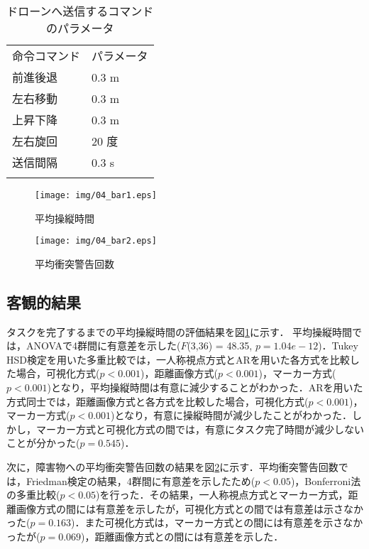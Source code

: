 \documentclass[submit]{ipsj}
\begin{document}
\begin{table}[tb]
  \caption{ドローンへ送信するコマンドのパラメータ}
  \label{tab:command_parameter}
  \centering
  \begin{tabular}{ll}
    \hline\noalign{\smallskip}
    命令コマンド &  パラメータ       \\
    \noalign{\smallskip}\hline\noalign{\smallskip}
    前進後退     & 0.3 m       \\
    左右移動     & 0.3 m       \\
    上昇下降     & 0.3 m       \\
    左右旋回     & 20 度       \\
    送信間隔     & 0.3 s       \\
    \noalign{\smallskip}\hline
  \end{tabular}
\end{table}


\begin{figure}[tb]
\centering
\texttt{[image: img/04\_bar1.eps]}
\caption{平均操縦時間}
\label{fig:04_bar1}
\end{figure}

\begin{figure}[tb]
\centering
\texttt{[image: img/04\_bar2.eps]}
\caption{平均衝突警告回数}
\label{fig:04_bar2}
\end{figure}


\subsection{客観的結果}
\label{result_1}
タスクを完了するまでの平均操縦時間の評価結果を図\ref{fig:04_bar1}に示す．
平均操縦時間では，ANOVAで4群間に有意差を示した($F$(3,36) = 48.35, $p = 1.04e-12 $)．Tukey HSD検定を用いた多重比較では，一人称視点方式とARを用いた各方式を比較した場合，可視化方式($p < 0.001$)，距離画像方式($p < 0.001$)，マーカー方式($p < 0.001$)となり，平均操縦時間は有意に減少することがわかった．ARを用いた方式同士では，距離画像方式と各方式を比較した場合，可視化方式($p < 0.001$)，マーカー方式($p < 0.001$)となり，有意に操縦時間が減少したことがわかった．しかし，マーカー方式と可視化方式の間では，有意にタスク完了時間が減少しないことが分かった($p = 0.545$)．
\par
次に，障害物への平均衝突警告回数の結果を図\ref{fig:04_bar2}に示す．平均衝突警告回数では，Friedman検定の結果，4群間に有意差を示したため($p < 0.05$)，Bonferroni法の多重比較($p < 0.05$)を行った．その結果，一人称視点方式とマーカー方式，距離画像方式の間には有意差を示したが，可視化方式との間では有意差は示さなかった($p = 0.163$)．また可視化方式は，マーカー方式との間には有意差を示さなかったが($p = 0.069$)，距離画像方式との間には有意差を示した．
\end{document}
